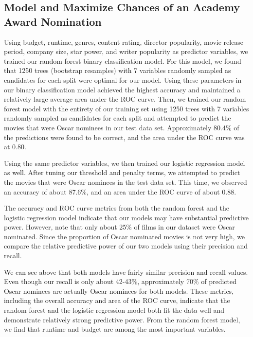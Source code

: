 \documentclass[10pt]{article}
\begin{document}
\subsection{Model and Maximize Chances of an Academy Award Nomination}

Using budget, runtime, genres, content rating, director popularity, movie release period, company size, star power, and writer popularity as predictor variables, we trained our random forest binary classification model. For this model, we found that 1250 trees (bootstrap resamples) with 7 variables randomly sampled as candidates for each split were optimal for our model. Using these parameters in our binary classification model achieved the highest accuracy and maintained a relatively large average area under the ROC curve. Then, we trained our random forest model with the entirety of our training set using 1250 trees with 7 variables randomly sampled as candidates for each split and attempted to predict the movies that were Oscar nominees in our test data set. Approximately 80.4\% of the predictions were found to be correct, and the area under the ROC curve was at 0.80.

Using the same predictor variables, we then trained our logistic regression model as well. After tuning our threshold and penalty terms, we attempted to predict the movies that were Oscar nominees in the test data set. This time, we observed an accuracy of about 87.6\%, and an area under the ROC curve of about 0.88.

The accuracy and ROC curve metrics from both the random forest and the logistic regression model indicate that our models may have substantial predictive power. However, note that only about 25\% of films in our dataset were Oscar nominated. Since the proportion of Oscar nominated movies is not very high, we compare the relative predictive power of our two models using their precision and recall.



We can see above that both models have fairly similar precision and recall values. Even though our recall is only about 42-43\%, approximately 70\% of predicted Oscar nominees are actually Oscar nominees for both models. These metrics, including the overall accuracy and area of the ROC curve, indicate that the random forest and the logistic regression model both fit the data well and demonstrate relatively strong predictive power. From the random forest model, we find that runtime and budget are among the most important variables.
\end{document}
